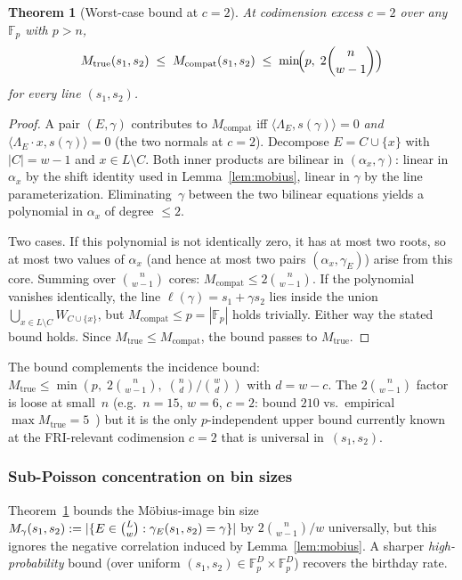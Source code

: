 \documentclass[11pt]{article}
\newtheorem{theorem}{Theorem}
\newcommand{\FF}{\mathbb{F}}
\begin{document}
\begin{theorem}[Worst-case bound at $c = 2$]
\label{thm:mtrue-2c}
At codimension excess $c = 2$ over any $\FF_p$ with $p > n$,
\[
   M_{\mathrm{true}}(s_1, s_2) \;\leq\; M_{\mathrm{compat}}(s_1, s_2) \;\leq\; \min\!\Bigl(p,\; 2\binom{n}{w - 1}\Bigr)
\]
for every line $(s_1, s_2)$.
\end{theorem}

\begin{proof}
A pair $(E, \gamma)$ contributes to $M_{\mathrm{compat}}$ iff $\langle \Lambda_E, s(\gamma)\rangle = 0$ \emph{and} $\langle \Lambda_E \cdot x, s(\gamma)\rangle = 0$ (the two normals at $c = 2$). Decompose $E = C \cup \{x\}$ with $|C| = w - 1$ and $x \in L \setminus C$. Both inner products are bilinear in $(\alpha_x, \gamma)$: linear in $\alpha_x$ by the shift identity used in Lemma~\ref{lem:mobius}, linear in $\gamma$ by the line parameterization. Eliminating~$\gamma$ between the two bilinear equations yields a polynomial in $\alpha_x$ of degree $\leq 2$.

Two cases. If this polynomial is not identically zero, it has at most two roots, so at most two values of $\alpha_x$ (and hence at most two pairs $(\alpha_x, \gamma_E)$) arise from this core. Summing over $\binom{n}{w-1}$ cores: $M_{\mathrm{compat}} \leq 2\binom{n}{w-1}$. If the polynomial vanishes identically, the line $\ell(\gamma) = s_1 + \gamma s_2$ lies inside the union $\bigcup_{x \in L \setminus C} W_{C \cup \{x\}}$, but $M_{\mathrm{compat}} \leq p = |\FF_p|$ holds trivially. Either way the stated bound holds. Since $M_{\mathrm{true}} \leq M_{\mathrm{compat}}$, the bound passes to $M_{\mathrm{true}}$.
\end{proof}

The bound complements the incidence bound: $M_{\mathrm{true}} \leq \min(p,\; 2\binom{n}{w-1},\; \binom{n}{d}/\binom{w}{d})$ with $d = w - c$. The $2\binom{n}{w-1}$ factor is loose at small~$n$ (e.g.\ $n = 15$, $w = 6$, $c = 2$: bound $210$ vs.\ empirical $\max M_{\mathrm{true}} = 5$~\cite{CompanionRepo}) but it is the only $p$-independent upper bound currently known at the FRI-relevant codimension $c = 2$ that is universal in~$(s_1, s_2)$.

\subsubsection*{Sub-Poisson concentration on bin sizes}

Theorem~\ref{thm:mtrue-2c} bounds the M\"obius-image bin size
$M_\gamma(s_1, s_2) := |\{E \in \tbinom{L}{w} : \gamma_E(s_1, s_2) = \gamma\}|$
by $2\binom{n}{w-1}/w$ universally, but this ignores the negative
correlation induced by Lemma~\ref{lem:mobius}. A sharper \emph{high-probability} bound (over uniform $(s_1, s_2) \in \FF_p^D \times \FF_p^D$) recovers the birthday rate.
\end{document}

